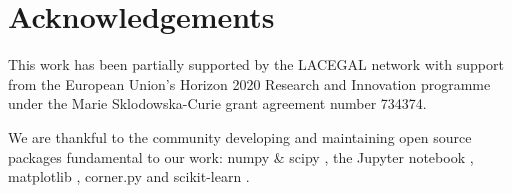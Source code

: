 \documentclass[usenatbib]{mnras}
\begin{document}
\section*{Acknowledgements}

This work has been partially supported by the LACEGAL network with support from the European Union's Horizon 2020 Research and Innovation programme under the Marie Sklodowska-Curie grant agreement number 734374.

We are thankful to the community developing and maintaining open source packages fundamental to our work: numpy
\&  scipy  \citep{VanDerWalt2011},  the  Jupyter  notebook  \citep{Kluyver2016}, matplotlib \citep{Hunter2007}, corner.py \citep{Foreman-Mackey2016} and  scikit-learn \citep{Pedregosa2011}.






\bsp	%
\label{lastpage}
\end{document}
